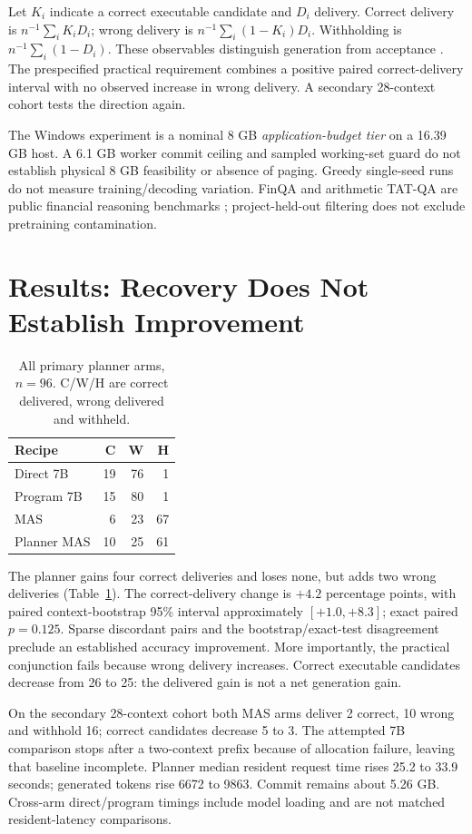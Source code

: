 \documentclass[10pt,twocolumn,letterpaper]{article}
\begin{document}
Let $K_i$ indicate a correct executable candidate and $D_i$ delivery. Correct delivery is $n^{-1}\sum_i K_iD_i$; wrong delivery is $n^{-1}\sum_i(1-K_i)D_i$. Withholding is $n^{-1}\sum_i(1-D_i)$. These observables distinguish generation from acceptance \citep{selective}. The prespecified practical requirement combines a positive paired correct-delivery interval with no observed increase in wrong delivery. A secondary 28-context cohort tests the direction again.

The Windows experiment is a nominal 8 GB \emph{application-budget tier} on a 16.39 GB host. A 6.1 GB worker commit ceiling and sampled working-set guard do not establish physical 8 GB feasibility or absence of paging. Greedy single-seed runs do not measure training/decoding variation. FinQA and arithmetic TAT-QA are public financial reasoning benchmarks \citep{finqa,tatqa}; project-held-out filtering does not exclude pretraining contamination.

\section{Results: Recovery Does Not Establish Improvement}
\begin{table}[t]\centering\small
\caption{All primary planner arms, $n=96$. C/W/H are correct delivered, wrong delivered and withheld.}\label{tab:planner}
\begin{tabular}{lrrr}\toprule Recipe&C&W&H\\\midrule Direct 7B&19&76&1\\Program 7B&15&80&1\\MAS&6&23&67\\Planner MAS&10&25&61\\\bottomrule\end{tabular}\end{table}
The planner gains four correct deliveries and loses none, but adds two wrong deliveries (Table~\ref{tab:planner}). The correct-delivery change is $+4.2$ percentage points, with paired context-bootstrap 95\% interval approximately $[+1.0,+8.3]$; exact paired $p=0.125$. Sparse discordant pairs and the bootstrap/exact-test disagreement preclude an established accuracy improvement. More importantly, the practical conjunction fails because wrong delivery increases. Correct executable candidates decrease from 26 to 25: the delivered gain is not a net generation gain.

On the secondary 28-context cohort both MAS arms deliver 2 correct, 10 wrong and withhold 16; correct candidates decrease 5 to 3. The attempted 7B comparison stops after a two-context prefix because of allocation failure, leaving that baseline incomplete. Planner median resident request time rises 25.2 to 33.9 seconds; generated tokens rise 6672 to 9863. Commit remains about 5.26 GB. Cross-arm direct/program timings include model loading and are not matched resident-latency comparisons.
\end{document}
